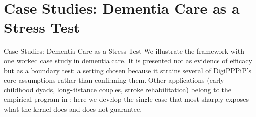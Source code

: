 \documentclass[
  ignorenonframetext,
]{beamer}
\author{\texorpdfstring{}{}}
\date{}
\begin{document}
\section{Case Studies: Dementia Care as a Stress
Test}\label{sec:casestudies}

\begin{frame}[allowframebreaks]{Case Studies: Dementia Care as a Stress
Test}
We illustrate the framework with one worked case study in dementia care.
It is presented not as evidence of efficacy but as a boundary test: a
setting chosen because it strains several of DigiPPPiP's core
assumptions rather than confirming them. Other applications
(early-childhood dyads, long-distance couples, stroke rehabilitation)
belong to the empirical program in ; here we develop
the single case that most sharply exposes what the kernel does and does
not guarantee.
\end{frame}
\end{document}
